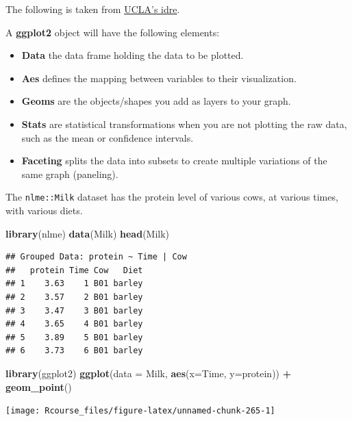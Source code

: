 \documentclass[]{book}
\newenvironment{Shaded}{\begin{snugshade}}{\end{snugshade}}
\newcommand{\KeywordTok}[1]{\textcolor[rgb]{0.13,0.29,0.53}{\textbf{#1}}}
\newcommand{\DataTypeTok}[1]{\textcolor[rgb]{0.13,0.29,0.53}{#1}}
\newcommand{\StringTok}[1]{\textcolor[rgb]{0.31,0.60,0.02}{#1}}
\newcommand{\OperatorTok}[1]{\textcolor[rgb]{0.81,0.36,0.00}{\textbf{#1}}}
\newcommand{\NormalTok}[1]{#1}
\providecommand{\tightlist}{%
  \setlength{\itemsep}{0pt}\setlength{\parskip}{0pt}}
\theoremstyle{definition}
\theoremstyle{definition}
\theoremstyle{definition}
\theoremstyle{remark}
\begin{document}
The following is taken from
\href{http://www.ats.ucla.edu/stat/r/seminars/ggplot2_intro/ggplot2_intro.htm}{UCLA's
idre}.

A \textbf{ggplot2} object will have the following elements:

\begin{itemize}
\tightlist
\item
  \textbf{Data} the data frame holding the data to be plotted.
\item
  \textbf{Aes} defines the mapping between variables to their
  visualization.
\item
  \textbf{Geoms} are the objects/shapes you add as layers to your graph.
\item
  \textbf{Stats} are statistical transformations when you are not
  plotting the raw data, such as the mean or confidence intervals.
\item
  \textbf{Faceting} splits the data into subsets to create multiple
  variations of the same graph (paneling).
\end{itemize}

The \texttt{nlme::Milk} dataset has the protein level of various cows,
at various times, with various diets.

\begin{Shaded}
\begin{Highlighting}[]
\KeywordTok{library}\NormalTok{(nlme)}
\KeywordTok{data}\NormalTok{(Milk)}
\KeywordTok{head}\NormalTok{(Milk)}
\end{Highlighting}
\end{Shaded}

\begin{verbatim}
## Grouped Data: protein ~ Time | Cow
##   protein Time Cow   Diet
## 1    3.63    1 B01 barley
## 2    3.57    2 B01 barley
## 3    3.47    3 B01 barley
## 4    3.65    4 B01 barley
## 5    3.89    5 B01 barley
## 6    3.73    6 B01 barley
\end{verbatim}

\begin{Shaded}
\begin{Highlighting}[]
\KeywordTok{library}\NormalTok{(ggplot2)}
\KeywordTok{ggplot}\NormalTok{(}\DataTypeTok{data =}\NormalTok{ Milk, }\KeywordTok{aes}\NormalTok{(}\DataTypeTok{x=}\NormalTok{Time, }\DataTypeTok{y=}\NormalTok{protein)) }\OperatorTok{+}
\StringTok{  }\KeywordTok{geom_point}\NormalTok{()}
\end{Highlighting}
\end{Shaded}

\texttt{[image: Rcourse\_files/figure-latex/unnamed-chunk-265-1]}
\end{document}
